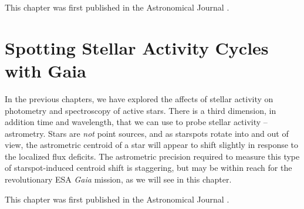 \documentclass[12pt, twoside]{uwthesis}
\newcommand{\gaia}{\textit{Gaia}\xspace}
\begin{document}
This chapter was first published in the Astronomical Journal \citep{Morris2018c}.



\chapter{Spotting Stellar Activity Cycles with Gaia} \label{chap:gaia}

In the previous chapters, we have explored the affects of stellar activity on photometry and spectroscopy of active stars. There is a third dimension, in addition time and wavelength, that we can use to probe stellar activity -- astrometry. Stars are \textit{not} point sources, and as starspots rotate into and out of view, the astrometric centroid of a star will appear to shift slightly in response to the localized flux deficits. The astrometric precision required to measure this type of starspot-induced centroid shift is staggering, but may be within reach for the revolutionary ESA \gaia mission, as we will see in this chapter.

This chapter was first published in the Astronomical Journal \citep{Morris2018b}.


\end{document}
